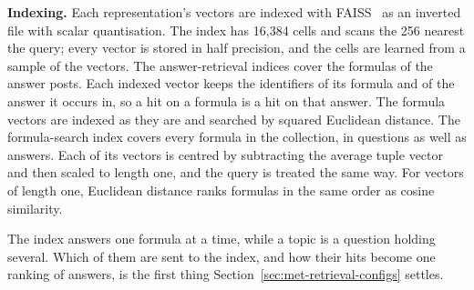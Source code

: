 \textbf{Indexing.} Each representation's vectors are indexed with
FAISS~\cite{johnson2021faiss} as an inverted file with scalar quantisation. The index has
16{,}384 cells and scans the 256 nearest the query; every vector is stored in half precision,
and the cells are learned from a sample of the vectors. The answer-retrieval indices cover the
formulas of the answer posts. Each indexed vector keeps the identifiers of its formula and of
the answer it occurs in, so a hit on a formula is a hit on that answer. The formula vectors are
indexed as they are and searched by squared Euclidean distance. The formula-search index covers
every formula in the collection, in questions as well as answers. Each of its vectors is centred by
subtracting the average tuple vector and then scaled to length one, and the query is treated
the same way. For vectors of length one, Euclidean distance ranks formulas in the same order
as cosine similarity.

The index answers one formula at a time, while a topic is a question holding several. Which
of them are sent to the index, and how their hits become one ranking of answers, is the first
thing Section~\ref{sec:met-retrieval-configs} settles.

